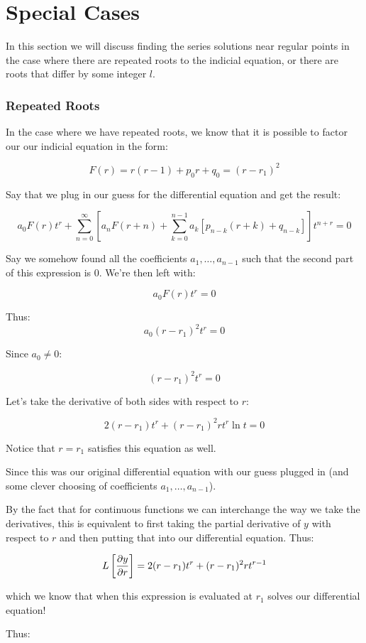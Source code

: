 \documentclass{report}
\begin{document}
{\section{Special Cases}
In this section we will discuss finding the series solutions near regular points in the case where there are repeated roots to the indicial equation, or there are roots that differ by some integer $l$. 

\subsubsection{Repeated Roots}
In the case where we have repeated roots, we know that it is possible to factor our our indicial equation in the form:

$$F(r) = r(r-1) + p_0r + q_0 = (r-r_1)^2$$

Say that we plug in our guess for the differential equation and get the result:

$$a_0F(r)t^r
+ \sum_{n=0}^\infty \left[ a_nF(r+n) + \sum_{k=0}^{n-1} a_k[ p_{n-k}(r+k) + q_{n-k}] \right]t^{n+r} = 0
$$

Say we somehow found all the coefficients $a_1, \dots, a_{n-1}$ such that the second part of this expression is 0. We're then left with:

$$a_0F(r)t^r = 0$$

Thus:
$$a_0(r-r_1)^2t^r = 0$$

Since $a_0 \neq 0 $:

$$(r-r_1)^2t^r = 0$$

Let's take the derivative of both sides with respect to $r$:

$$2(r-r_1)t^r + (r-r_1)^2rt^r\ln t = 0$$


Notice that $r=r_1$ satisfies this equation as well.

Since this was our original differential equation with our guess plugged in (and some clever choosing of coefficients $a_1, \dots, a_{n-1}$).

By the fact that for continuous functions we can interchange the way we take the derivatives, this is equivalent to first taking the partial derivative of $y$ with respect to $r$ and then putting that into our differential equation. Thus:


$$L\left[\pdv{y}{r}\right] = 2(r-r_1)t^r + (r-r_1)^2rt^{r-1}$$

which we know that when this expression is evaluated at $r_1$ solves our differential equation!

Thus:

}
\end{document}
